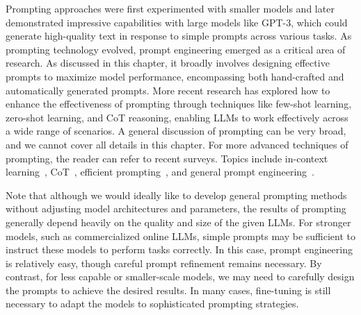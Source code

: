 Prompting approaches were first experimented with smaller models and later demonstrated impressive capabilities with large models like GPT-3, which could generate high-quality text in response to simple prompts across various tasks. As prompting technology evolved, prompt engineering emerged as a critical area of research. As discussed in this chapter, it broadly involves designing effective prompts to maximize model performance, encompassing both hand-crafted and automatically generated prompts. More recent research has explored how to enhance the effectiveness of prompting through techniques like few-shot learning, zero-shot learning, and CoT reasoning, enabling LLMs to work effectively across a wide range of scenarios. A general discussion of prompting can be very broad, and we cannot cover all details in this chapter. For more advanced techniques of prompting, the reader can refer to recent surveys. Topics include in-context learning~\cite{li:2023practical,dong-etal:2022survey}, CoT~\cite{chu-etal:2023survey,yu-etal:2023towards,zhang-etal:2023igniting}, efficient prompting~\cite{chang-etal:2024efficient}, and general prompt engineering~\cite{liu2023-etal:prompting,chen-etal:2023unleashing}.

Note that although we would ideally like to develop general prompting methods without adjusting model architectures and parameters, the results of prompting generally depend heavily on the quality and size of the given LLMs. For stronger models, such as commercialized online LLMs, simple prompts may be sufficient to instruct these models to perform tasks correctly. In this case, prompt engineering is relatively easy, though careful prompt refinement remains necessary. By contrast, for less capable or smaller-scale models, we may need to carefully design the prompts to achieve the desired results. In many cases, fine-tuning is still necessary to adapt the models to sophisticated prompting strategies.

